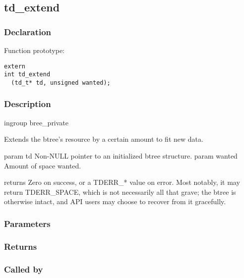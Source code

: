 
\newpage
\subsection{td\_extend}
\subsubsection{Declaration} Function prototype:

\begin{verbatim}
extern
int td_extend
  (td_t* td, unsigned wanted);
\end{verbatim}

\subsubsection{Description}


 ingroup bree\_private

 Extends the btree's resource by a certain amount to fit new data.

 param td Non-NULL pointer to an initialized btree structure.
 param wanted Amount of space wanted.

 returns Zero on success, or a TDERR\_* value on error.
 Most notably, it may return TDERR\_SPACE, which is not necessarily
 all that grave; the btree is otherwise intact, and API users may choose
 to recover from it gracefully.
 

\subsubsection{Parameters}
\subsubsection{Returns}
\subsubsection{Called by}
